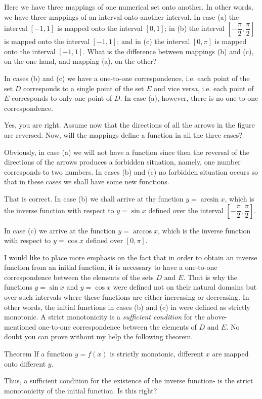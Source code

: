 {Here we have three mappings of one numerical set onto another. In other words, we have three mappings of an interval onto another interval. In case (a) the interval $[-1, 1]$ is mapped onto the interval $[0, 1]$; in (b) the
interval $\left[-\dfrac{\pi}{2}, \dfrac{\pi}{2} \right]$ is mapped onto the interval $[-1, 1]$; and in (c) the interval $[0, \pi]$ is mapped onto the interval $[-1, 1]$.
What is the difference between mappings (b) and (c), on the one hand, and mapping (a), on the other?

\rdr In cases (b) and (c) we have a one-to-one correspondence, i.e. each point of the set $D$ corresponds to a single point of the set $E$ and vice versa, i.e. each point of $E$ corresponds to only one point of $D$. In case (a), however, there is no one-to-one correspondence.

\athr Yes, you are right. Assume now that the directions of all the arrows in the figure are reversed. Now, will the mappings define a function in all the three cases?

\rdr Obviously, in case (a) we will not have a function since then the reversal of the directions of the arrows produces a forbidden situation, namely, one number corresponds to two numbers. In cases (b) and (c) no forbidden situation occurs so that in these cases we shall have some new functions.

\athr That is correct. In case (b) we shall arrive at the function $y = \arcsin x$, which is the inverse function with respect to $y = \sin x$ defined over the interval $\left[-\dfrac{\pi}{2}, \dfrac{\pi}{2} \right]$.

In case (c) we arrive at the function $y =\arccos x$, which is the inverse function with respect to $y = \cos x$ defined over $[0, \pi]$.

I would like to place more emphasis on the fact that in order to obtain an inverse function from an initial function, it is necessary to have a one-to-one correspondence between the elements of the sets $D$ and $E$. That is why the functions $y = \sin x$ and $y = \cos x$ were defined not on their natural domains but over such intervals where these functions are either increasing or decreasing. In other words, the initial functions in cases (b) and (c) in  were defined as strictly monotonic. A strict monotonicity is a \emph{sufficient
condition} for the above-mentioned one-to-one correspondence between the elements of $D$ and $E$. No doubt you can prove without my help the following
theorem.
\begin{mytheo}{Theorem}
If a function $y = f(x)$ is strictly monotonic, different $x$ are mapped onto different $y$.
\end{mytheo}
\rdr Thus, a sufficient condition for the existence of the inverse function- is the strict monotonicity of the initial function. Is this right?

}
